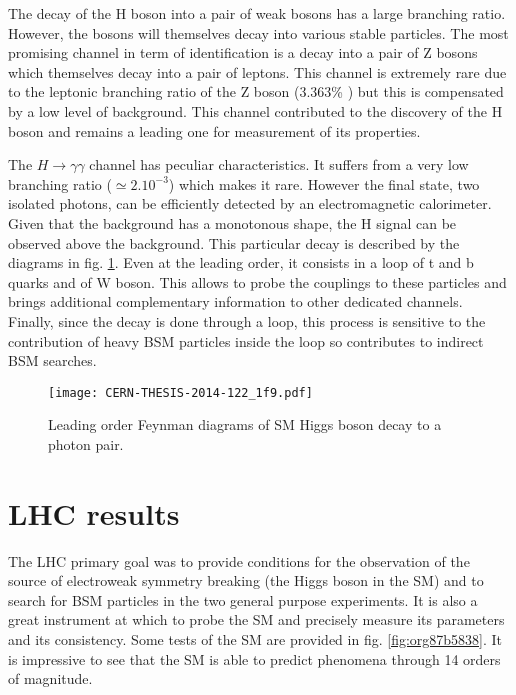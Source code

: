 \begin{enumerate}
The decay of the H boson into a pair of weak bosons has a large branching ratio.
However, the bosons will themselves decay into various stable particles.
The most promising channel in term of identification is a decay into a pair of Z bosons which themselves decay into a pair of leptons.
This channel is extremely rare due to the leptonic branching ratio of the Z boson (3.363\% \cite{PDG2016}) but this is compensated by a low level of background.
This channel contributed to the discovery of the H boson and remains a leading one for measurement of its properties.


The \(H\rightarrow \gamma\gamma\) channel has peculiar characteristics.
It suffers from a very low branching ratio (\(\simeq 2.10^{-3}\)) which makes it rare.
However the final state, two isolated photons, can be efficiently detected by an electromagnetic calorimeter.
Given that the background has a monotonous shape, the H signal can be observed above the background.
This particular decay is described by the diagrams in fig. \ref{fig:org310104c}.
Even at the leading order, it consists in a loop of t and b quarks and of W boson.
This allows to probe the couplings to these particles and brings additional complementary information to other dedicated channels.
Finally, since the decay is done through a loop, this process is sensitive to the contribution of heavy BSM particles inside the loop so contributes to indirect BSM searches.

\begin{figure}[htbp]
\centering
\texttt{[image: CERN-THESIS-2014-122\_1f9.pdf]}
\caption{\label{fig:org310104c}
Leading order Feynman diagrams of SM Higgs boson decay to a photon pair. \cite{CERN-THESIS-2014-122}}
\end{figure}
\end{enumerate}


\section{LHC results}
\label{sec:orgf76e3ba}

The LHC primary goal was to provide conditions for the observation of the source of electroweak symmetry breaking (the Higgs boson in the SM) and to search for BSM particles in the two general purpose experiments.
It is also a great instrument at which to probe the SM and precisely measure its parameters and its consistency.
Some tests of the SM are provided in fig. \ref{fig:org87b5838}.
It is impressive to see that the SM is able to predict phenomena through 14 orders of magnitude.


